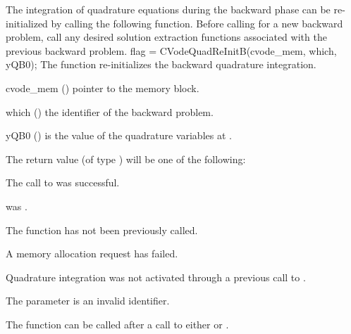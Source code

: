 The integration of quadrature equations during the backward phase can be
re-initialized by calling the following function.
Before calling  for a new backward problem, call any
desired solution extraction functions  associated with the
previous backward problem.
{
  flag = CVodeQuadReInitB(cvode\_mem, which, yQB0);
}
{
  The function  re-initializes the backward quadrature integration.
}
{
  \begin{args}
  \item[cvode\_mem] ()
    pointer to the {\cvodes} memory block.
  \item[which] ()
    the identifier of the backward problem.
  \item[yQB0] ()
    is the value of the quadrature variables at .
  \end{args}
}
{
  The return value  (of type ) will be one of the following:
  \begin{args}
  \item[\Id{CV\_SUCCESS}]
    The call to  was successful.
 \item[\Id{CV\_MEM\_NULL}] 
     was .
  \item[\Id{CV\_NO\_ADJ}]
    The function  has not been previously called.
  \item[\Id{CV\_MEM\_FAIL}] 
    A memory allocation request has failed.
  \item[\Id{CV\_NO\_QUAD}] 
    Quadrature integration was not activated through a  previous 
    call to .
  \item[\Id{CV\_ILL\_INPUT}]
    The parameter  is an invalid identifier.
  \end{args}
}
{
  The function  can be called after a call to either
   or .
}

